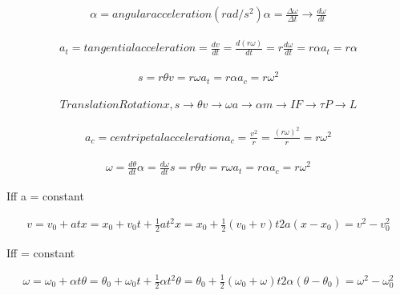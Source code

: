 	\begin{align}
		\alpha = angular acceleration (rad/s^{2})
		\alpha = \frac{\Delta \omega}{\Delta t} \to \frac{d \omega}{dt}
	\end{align}

	\begin{align}
		a_{t} = tangential acceleration
		= \frac{dv}{dt} = \frac{d(r\omega)}{dt}
		= r \frac{d \omega}{dt} = r \alpha
		a_{t} = r \alpha
	\end{align}

	\begin{align}
		s = r \theta
		v = r \omega
		a_{t} = r \alpha
		a_{c} = r \omega^{2}
	\end{align}

	\begin{align}
		Translation Rotation
		x,s \to \theta
		v \to \omega
		a \to \alpha
		m \to I
		F \to \tau
		P \to L
	\end{align}

	\begin{align}
		a_{c} = centripetal acceleration
		a_{c} = \frac{v^{2}}{r} = \frac{(r \omega)^{2}}{r} = r \omega^{2}
	\end{align}

	\begin{align}
		\omega = \frac{d \theta}{dt}
		\alpha = \frac{d \omega}{dt}
		s = r \theta
		v = r \omega
		a_{t} = r \alpha
		a_{c} = r \omega^{2}
	\end{align}

	Iff a = constant

	\begin{align}
		v = v_{0} + at
		x = x_{0} + v_{0}t + \frac{1}{2}at^{2}
		x = x_{0} + \frac{1}{2}(v_{0} + v)t
		2a(x - x_{0}) = v^{2} - v_{0}^{2}
	\end{align}

	Iff \alpha = constant

	\begin{align}
		\omega = \omega_{0} + \alpha t
		\theta = \theta_{0} + \omega_{0} t + \frac{1}{2}\alpha t^{2}
		\theta = \theta_{0} + \frac{1}{2}(\omega_{0} + \omega)t
		2\alpha(\theta - \theta_{0}) = \omega^{2} - \omega_{0}^{2}
	\end{align}
